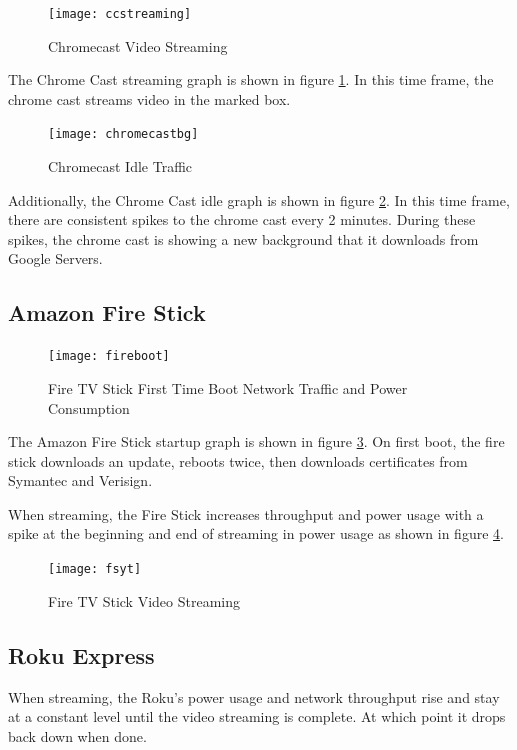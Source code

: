 \begin{figure}[H]
  \centering
  \texttt{[image: ccstreaming]}
  \caption{Chromecast Video Streaming}
  \label{fig:ccstream}
\end{figure}

The Chrome Cast streaming graph is shown in figure \ref{fig:ccstream}. In this time frame, the chrome cast streams video in the marked box.

\begin{figure}[H]
  \centering
  \texttt{[image: chromecastbg]}
  \caption{Chromecast Idle Traffic}
  \label{fig:ccbg}
\end{figure}

Additionally, the Chrome Cast idle graph is shown in figure \ref{fig:ccbg}. In this time frame, there are consistent spikes to the chrome cast every 2 minutes. During these spikes, the chrome cast is showing a new background that it downloads from Google Servers.

\subsection{Amazon Fire Stick}

\begin{figure}[H]
  \centering
  \texttt{[image: fireboot]}
  \caption{Fire TV Stick First Time Boot Network Traffic and Power Consumption}
  \label{fig:fireboth}
\end{figure}

The Amazon Fire Stick startup graph is shown in figure \ref{fig:fireboth}. On first boot, the fire stick downloads an update, reboots twice, then downloads certificates from Symantec and Verisign.

When streaming, the Fire Stick increases throughput and power usage with a spike at the beginning and end of streaming in power usage as shown in figure \ref{fig:fsyt}.

\begin{figure}[H]
  \centering
  \texttt{[image: fsyt]}
  \caption{Fire TV Stick Video Streaming}
  \label{fig:fsyt}
\end{figure}

\subsection{Roku Express}
When streaming, the Roku's power usage and network throughput rise and stay at a constant level until the video streaming is complete. At which point it drops back down when done.

